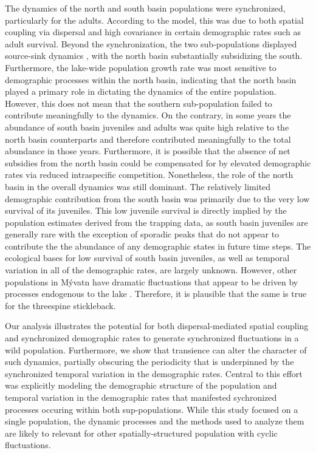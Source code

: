 The dynamics of the north and south basin populations were synchronized,
particularly for the adults. 
According to the model, 
this was due to both spatial coupling via dispersal 
and high covariance in certain demographic rates such as adult survival.
Beyond the synchronization, 
the two sub-populations displayed source-sink dynamics \citep{pulliam1988},
with the north basin substantially subsidizing the south.
Furthermore,
the lake-wide population growth rate was most sensitive to demographic processes 
within the north basin,
indicating that the north basin played a primary role in dictating the dynamics 
of the entire population.
However, this does not mean that the southern sub-population failed to contribute 
meaningfully to the dynamics.
On the contrary,
in some years the abundance of south basin juveniles and adults was quite high relative
to the north basin counterparts 
and therefore contributed meaningfully to the total abundance in those years.
Furthermore, it is possible that the absence of net subsidies from the north basin
could be compensated for by elevated demographic rates via reduced intraspecific competition.
Nonetheless, the role of the north basin in the overall dynamics was still dominant.
The relatively limited demographic contribution from the south basin was primarily due
to the very low survival of its juveniles. 
This low juvenile survival is directly implied by the population estimates derived 
from the trapping data,
as south basin juveniles are generally rare with the exception of sporadic peaks that
do not appear to contribute the the abundance of any demographic states in future time steps.
The ecological bases for low survival of south basin juveniles,
as well as temporal variation in all of the demographic rates,
are largely unknown.
However, other populations in M\'{y}vatn have dramatic fluctuations that appear to be 
driven by processes endogenous to the lake
\citep{einarsson2002, ives2008, einarsson2016}. 
Therefore, it is plausible that the same is true for the threespine stickleback.

Our analysis illustrates the potential for both dispersal-mediated spatial coupling 
and synchronized demographic rates to generate synchronized fluctuations in a wild population.
Furthermore, we show that transience can alter the character of such dynamics,
partially obscuring the periodicity that is underpinned by the synchronized temporal
variation in the demographic rates.
Central to this effort was explicitly modeling the demographic structure of the population
and temporal variation in the demographic rates 
that manifested sychronized processes occuring within both sup-populations.
While this study focused on a single population,
the dynamic processes and the methods used to analyze them are likely to relevant for 
other spatially-structured population with cyclic fluctuations.






